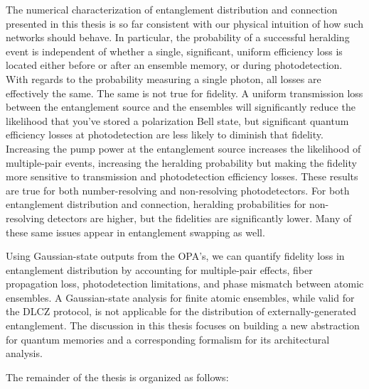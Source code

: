 \documentclass[aps,twocolumn,secnumarabic,amsmath,amssymb,pra,groupedaddress,
showpacs, showkeys]{revtex4-1}
\begin{document}

The numerical characterization of entanglement distribution and connection
presented in this thesis is so far consistent with our physical intuition of
how such networks should behave. In particular, the probability of a successful
heralding event is independent of whether a single, significant, uniform
efficiency loss is located either before or after an ensemble memory, or during
photodetection. With regards to the probability measuring a single photon, all
losses are effectively the same. The same is not true for fidelity. A uniform
transmission loss between the entanglement source and the ensembles will
significantly reduce the likelihood that you've stored a polarization Bell
state, but significant quantum efficiency losses at photodetection are less
likely to diminish that fidelity. Increasing the pump power at the entanglement
source increases the likelihood of multiple-pair events, increasing the
heralding probability but making the fidelity more sensitive to transmission
and photodetection efficiency losses. These results are true for both
number-resolving and non-resolving photodetectors. For both entanglement
distribution and connection, heralding probabilities for non-resolving
detectors are higher, but the fidelities are significantly lower. Many of these
same issues appear in entanglement swapping as well.

Using Gaussian-state outputs from the OPA's, we can quantify fidelity loss in
entanglement distribution by accounting for multiple-pair effects, fiber
propagation loss, photodetection limitations, and phase mismatch between atomic
ensembles. A Gaussian-state analysis for finite atomic ensembles, while valid
for the DLCZ protocol, is not applicable for the distribution of
externally-generated entanglement. The discussion in this thesis focuses on
building a new abstraction for quantum memories and a corresponding formalism
for its  architectural analysis.

The remainder of the thesis is organized as follows:
\end{document}
